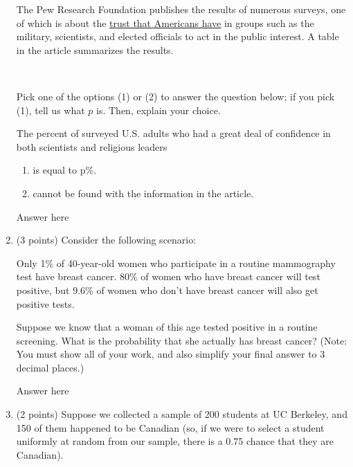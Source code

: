 \documentclass[11pt]{article}
\begin{document}
\begin{enumerate}
        The Pew Research Foundation publishes the results of numerous surveys, one of which
        is about the \href{https://www.pewresearch.org/fact-tank/2019/03/22/public-confidence-in-scientists-has-remained-stable-for-decades/}{\underline{trust that Americans have}} in groups such as the military, scientists, and elected officials to act in the public interest. A table in the article summarizes the results.
        
        \ 
        
        Pick one of the options (1) or (2) to answer the question below; if you pick (1), tell us
        what $p$ is. Then, explain your choice.
        
        The percent of surveyed U.S. adults who had a great deal of confidence in both scientists
        and religious leaders
        \begin{enumerate}[1.]
            \item is equal to p\%. %
            \item cannot be found with the information in the article.
        \end{enumerate}
        \begin{Answer}
            Answer here
        \end{Answer}
   \newpage
   
   
           \item (3 points) Consider the following scenario:
           
            Only 1\% of 40-year-old women who participate in a routine mammography test have breast cancer. 80\% of women who have breast cancer will test positive, but 9.6\% of women who don’t have breast cancer will also get positive tests.
            
            Suppose we know that a woman of this age tested positive in a routine screening. What is the probability that she actually has breast cancer? (Note: You must show all of your work, and also simplify your final answer to 3 decimal places.)
            \begin{Answer}
                Answer here
            \end{Answer}
    \newpage
        
        
            \item (2 points) Suppose we collected a sample of 200 students at UC Berkeley, and 150 of them happened to be Canadian (so, if we were to select a student uniformly at random from our sample, there is a 0.75 chance that they are Canadian).
            

\end{enumerate}
\end{document}
